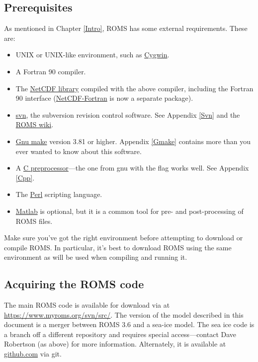 \subsection{Prerequisites}
As mentioned in Chapter \ref{Intro}, ROMS has some external
requirements. These are:
\begin{itemize}
    \item UNIX or UNIX-like environment, such as
      \href{http://www.redhat.com/services/custom/cygwin/}{Cygwin}.
    \item A Fortran 90 compiler.
    \item The
      \href{http://www.unidata.ucar.edu/software/netcdf/index.html}{NetCDF
      library} compiled with the above compiler, including the
      Fortran 90 interface
      (\href{http://www.unidata.ucar.edu/downloads/netcdf/netcdf-fortran/}{NetCDF-Fortran}
      is now a separate package).
    \item \href{http://subversion.tigris.org}{svn}, the subversion
      revision control software. See Appendix \ref{Svn} and the
      \href{https://www.myroms.org/wiki/index.php/Subversion}{ROMS wiki}.
    \item \href{http://www.gnu.org/software/make/}{Gnu make} version
      3.81 or higher. Appendix \ref{Gmake} contains more than you
      ever wanted to know about this software.
    \item A \href{http://en.wikipedia.org/wiki/C_preprocessor}{C
      preprocessor}---the one from gnu with the 
      flag works well. See Appendix \ref{Cpp}.
    \item The \href{http://www.perl.org}{Perl} scripting language.
    \item \href{http://www.mathworks.com/products/matlab/}{Matlab} is
      optional, but it is a common tool for pre- and post-processing
      of ROMS files.
\end{itemize}
Make sure you've got the right environment before attempting to
download or compile ROMS. In particular, it's best to download ROMS
using the same environment as will be used when compiling and
running it.

\subsection{Acquiring the ROMS code}
The main ROMS code is available for download via  at
\url{https://www.myroms.org/svn/src/}.
The version of the model described in this document is a merger between
ROMS 3.6 and a sea-ice model.
The sea ice code is a branch off a different repository and requires
special access---contact Dave Robertson (as above) for more information.
Alternately, it is available at
\href{https://kshedstrom@github.com/kshedstrom/roms.git}{github.com}
via git.

